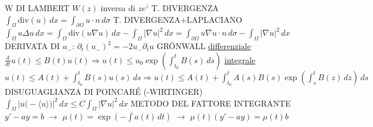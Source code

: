 \documentclass{article}
\begin{document}
W DI LAMBERT $W(z)$ inversa di $ze^z$
T. DIVERGENZA $\int_\Omega \text{div}(u)\,dx = \int_{\partial \Omega} u \cdot n\,d \sigma$
T. DIVERGENZA+LAPLACIANO $\int_\Omega u \Delta u\,dx = \int_\Omega \text{div}(u \nabla u)\,dx - \int_\Omega |\nabla u |^2 \,dx = \int_{\partial \Omega} u \nabla u \cdot n\,d \sigma - \int_\Omega |\nabla u |^2 \,dx$
DERIVATA DI $u_-$: $\partial_t (u_-)^2 = -2u_- \partial_t u$
GRÖNWALL \underline{differenziale} $\frac{d}{dt}u(t)\leq B(t)u(t) \Rightarrow u(t)\leq u_0 \exp(\int_{t_0}^tB(s)\,ds)$
\underline{integrale}
$u(t)\leq A(t)+\int_{t_0}^tB(s)u(s)\,ds \Rightarrow u(t)\leq A(t)+\int_{t_0}^tA(s)B(s)\exp(\int_s^tB(z)\,dz)\,ds$
DISUGUAGLIANZA DI POINCARÉ (-WIRTINGER) $\int_\Omega |u\boldsymbol{(}-\langle u \rangle\boldsymbol{)}|^2\,dx \leq C \int_\Omega|\nabla u|^2\,dx$
METODO DEL FATTORE INTEGRANTE 
$y'-ay=b$ $\rightarrow$
$\mu(t)=\exp(-\int a(t)\,dt)$ $\rightarrow$
$\mu(t)(y'-ay)=\mu(t)b$
\end{document}
